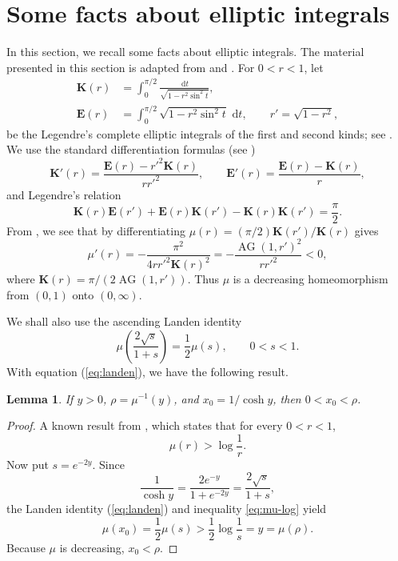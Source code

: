 \documentclass[11pt]{article}
\newtheorem{lemma}[theorem]{Lemma}
\theoremstyle{remark}
\newcommand{\Kc}{\mathbf K}
\newcommand{\Ec}{\mathbf E}
\newcommand{\M}{\operatorname{AG}}
\newcommand{\dd}{\,\mathrm d}
\begin{document}
\section{Some facts about elliptic integrals}
In this section, we recall some facts about elliptic integrals. The material presented in this section is adapted from \cite{AVVbook} and \cite{HKV20}.
For $0<r<1$, let
\begin{align*}
 \Kc(r)&=\int_0^{\pi/2}\frac{\dd t}
 {\sqrt{1-r^2\sin^2t}},\\
 \Ec(r)&=\int_0^{\pi/2}\sqrt{1-r^2\sin^2t}\,\dd t,
 \qquad r'=\sqrt{1-r^2},
\end{align*}
be the Legendre's complete elliptic integrals of the first and second kinds; see \cite[Formula (3.1)-(3.2)]{AVVbook}.  We use the
standard differentiation formulas (see \cite[Formula (3.6)-(3.7)]{AVVbook})
\begin{equation}\label{eq:KE-derivatives}
 \Kc'(r)=\frac{\Ec(r)-r'^2\Kc(r)}{rr'^2},
 \qquad
 \Ec'(r)=\frac{\Ec(r)-\Kc(r)}r,
\end{equation}
and Legendre's relation \cite[Formula (3.3)]{AVVbook}
\begin{equation}\label{eq:legendredcsdcs}
 \Kc(r)\Ec(r')+\Ec(r)\Kc(r')
 -\Kc(r)\Kc(r')=\frac{\pi}{2}.
\end{equation}
 From \cite[Formula (3.10)]{AVVbook}, we see that by differentiating
$\mu(r)=(\pi/2)\Kc(r')/\Kc(r)$ gives 
\begin{equation}\label{eq:mu-prime}
 \mu'(r)=-\frac{\pi^2}{4rr'^2\Kc(r)^2}
 =-\frac{\M(1,r')^2}{rr'^2}<0,
\end{equation}
where $\Kc(r)=\pi/(2\M(1,r'))$.  Thus $\mu$ is a decreasing
homeomorphism from $(0,1)$ onto $(0,\infty)$.

We shall also use the ascending Landen identity \cite[p. 51]{AVVbook}
\begin{equation}\label{eq:landen}
 \mu\!\left(\frac{2\sqrt{s}}{1+s}\right)=\frac12\mu(s),
 \qquad 0<s<1.
\end{equation}
With equation (\ref{eq:landen}), we have the following result.
\begin{lemma}\label{lem:initial}
If $y>0$, $\rho=\mu^{-1}(y)$, and
$x_0=1/\cosh y$, then $0<x_0<\rho$.
\end{lemma}
\begin{proof}
A known result from  \cite[P. 122, (7.21)]{HKV20}, which states  that  for every $0<r<1$,
\begin{equation}\label{eq:mu-log}
 \mu(r)>\log\frac1r.
\end{equation}
Now put $s=e^{-2y}$.  Since
$$
 \frac1{\cosh y}=\frac{2e^{-y}}{1+e^{-2y}}
 =\frac{2\sqrt{s}}{1+s},
$$
the Landen identity (\ref{eq:landen}) and inequality \eqref{eq:mu-log} yield
$$
 \mu(x_0)=\frac{1}{2}\mu(s)>\frac{1}{2}\log\frac{1}{s}
 =y=\mu(\rho).
$$
Because $\mu$ is decreasing, $x_0<\rho$.
\end{proof}
\end{document}
